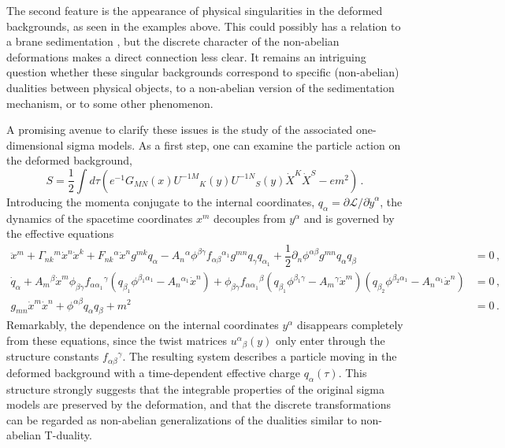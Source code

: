 \documentclass[12pt, utf8]{article}
\numberwithin{equation}{section}
\begin{document}
The second feature is the appearance of physical singularities in the deformed backgrounds, as seen in the examples above. This could possibly has a relation to a brane sedimentation \cite{Barakin:2026mxz}, but the discrete character of the non-abelian deformations makes a direct connection less clear. It remains an intriguing question whether these singular backgrounds correspond to specific (non-abelian) dualities between physical objects, to a non-abelian version of the sedimentation mechanism, or to some other phenomenon.

A promising avenue to clarify these issues is the study of the associated one-dimensional sigma models. As a first step, one can examine the particle action on the deformed background,
\begin{equation}
    S = \dfrac{1}{2} \int d\tau \left(   e^{-1} G_{M N}(x) U^{-1 M}{}_{K}(y) U^{-1 N}{}_{S}(y) \dot{X}^{K} \dot{X}^{S}  - e m^2  \right) \, .
\end{equation}
Introducing the momenta conjugate to the internal coordinates, $q_\alpha = \partial\mathcal{L}/\partial \dot{y}^\alpha$, the dynamics of the spacetime coordinates $x^m$ decouples from $y^\alpha$ and is governed by the effective equations
\begin{equation}
    \begin{aligned}
        \ddot{x}^{m} + \Gamma_{n k}{}^{m} \dot{x}^{n} \dot{x}^{k} + F_{n k}{}^{\alpha}\dot{x}^{n} g^{m k} q_{\alpha} - A_{n}{}^{\alpha} \phi^{\beta \gamma} f_{\alpha \beta}{}^{\alpha_1}g^{m n}q_{\gamma} q_{\alpha_1} + \dfrac{1}{2}\partial_{n} \phi^{\alpha \beta}g^{m n} q_{\alpha}q_{ \beta} & = 0 \, , \\
        \dot{q}_{\alpha} + A_{m}{}^{\beta} \dot{x}^{m}\phi_{\beta \gamma} f_{\alpha \alpha_1}{}^{\gamma} (q_{\beta_1 } \phi^{\beta_1 \alpha_1} - A_{n}{}^{\alpha_1}\dot{x}^{n}) + \phi_{\beta \gamma} f_{\alpha \alpha_1}{}^{\beta} (q_{\beta_1 } \phi^{\beta_1 \gamma} - A_{m}{}^{\gamma}\dot{x}^{m}) (q_{\beta_2 } \phi^{\beta_2 \alpha_1} - A_{n}{}^{\alpha_1}\dot{x}^{n}) & = 0     \, , \\
        g_{m n} \dot{x}^{m} \dot{x}^{n} + \phi^{\alpha \beta} q_{\alpha} q_{\beta} + m^2& = 0 \, .
    \end{aligned}
\end{equation}
Remarkably, the dependence on the internal coordinates $y^\alpha$ disappears completely from these equations, since the twist matrices $u^\alpha{}_\beta(y)$ only enter through the structure constants $f_{\alpha\beta}{}^\gamma$. The resulting system describes a particle moving in the deformed background with a time-dependent effective charge $q_\alpha(\tau)$. This structure strongly suggests that the integrable properties of the original sigma models are preserved by the deformation, and that the discrete transformations can be regarded as non-abelian generalizations of the dualities similar to non-abelian T-duality.
\end{document}
